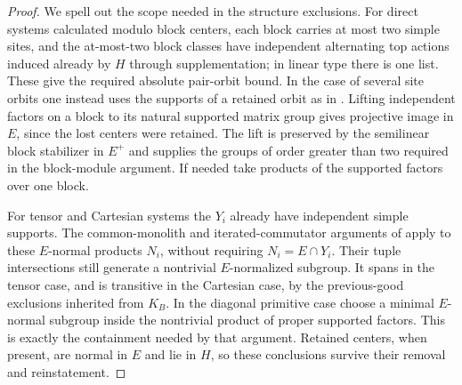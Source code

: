 \begin{proof}
We spell out the scope needed in the structure exclusions.
For direct systems calculated modulo block centers, each block
carries at most two simple sites, and the at-most-two block classes
have independent alternating top actions induced already by $H$
through supplementation; in linear type there is one list.
These give the required absolute pair-orbit bound.  In the case
of several site orbits one instead uses the supports of a retained
orbit as in .  Lifting independent factors on a
block to its natural supported matrix group gives projective image
in $E$, since the lost centers were retained.  The lift is preserved
by the semilinear block stabilizer in $E^+$ and supplies the groups
of order greater than two required in the block-module argument.
If needed take products of the supported factors over one block.

For tensor and Cartesian systems the $Y_i$ already have independent
simple supports.  The common-monolith and iterated-commutator
arguments of  apply to these
$E$-normal products $N_i$, without requiring
$N_i=E\cap Y_i$.  Their tuple intersections still generate a
nontrivial $E$-normalized subgroup.  It spans in the tensor case,
and is transitive in the Cartesian case, by the previous-good
exclusions inherited from $K_B$.  In the diagonal primitive case
choose a minimal $E$-normal subgroup inside the nontrivial product
of proper supported factors.  This is exactly the containment
needed by that argument.  Retained centers, when present, are
normal in $E$ and lie in $H$, so these conclusions survive their
removal and reinstatement.
\end{proof}


